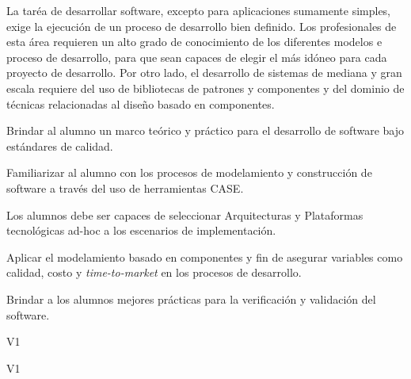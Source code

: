 \begin{syllabus}


\begin{justification}
La taréa de desarrollar software, excepto para aplicaciones sumamente simples, exige la ejecución de un proceso de desarrollo bien definido. 
Los profesionales de esta área requieren un alto grado de conocimiento de los diferentes modelos e proceso de desarrollo, 
para que sean capaces de elegir el más idóneo para cada proyecto de desarrollo. Por otro lado, el desarrollo de sistemas 
de mediana y gran escala requiere del uso de bibliotecas de patrones y componentes y del dominio de técnicas relacionadas al 
diseño basado en componentes.
\end{justification}

\begin{goals}
\item Brindar al alumno un marco teórico y práctico para el desarrollo de software bajo estándares de calidad.
\item Familiarizar al alumno con los procesos de modelamiento y construcción de software a través del uso de herramientas CASE.
\item Los alumnos debe ser capaces de seleccionar Arquitecturas y Plataformas tecnológicas ad-hoc a los escenarios de implementación.
\item Aplicar el modelamiento basado en componentes y fin de asegurar variables como calidad, costo  y {\it time-to-market} en los procesos de desarrollo.
\item Brindar a los alumnos mejores prácticas para la verificación y validación del software.
\end{goals}

\begin{outcomes}{V1}
    \item {}
    \item {}
    \item {}
    \item {}
\end{outcomes}

\begin{competences}{V1}
      \item {} 
      \item {} 
      \item {}
      \item {}
      \item {}
      \item {}
      \item {}
      \item {}
      \item {}
\end{competences}


\end{syllabus}

